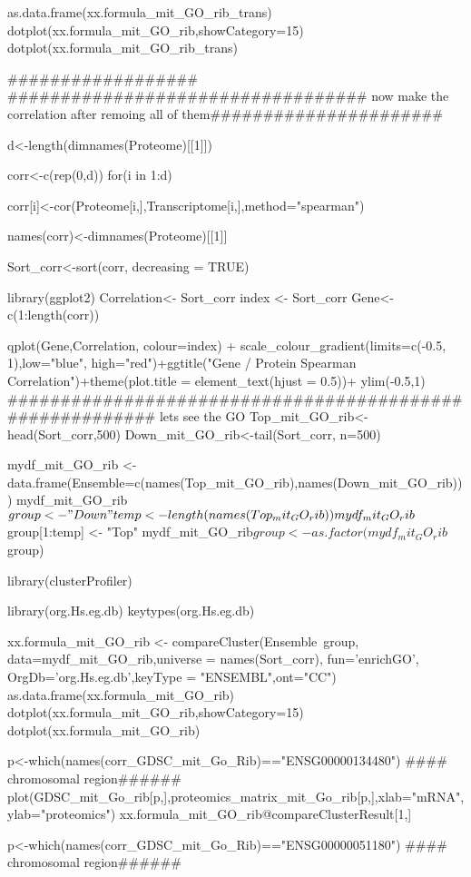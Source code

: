 {as.data.frame(xx.formula_mit_GO_rib_trans)
dotplot(xx.formula_mit_GO_rib,showCategory=15)
dotplot(xx.formula_mit_GO_rib_trans)










##################    ################################## now make the correlation after remoing all of them######################

d<-length(dimnames(Proteome)[[1]])

corr<-c(rep(0,d))
for(i in 1:d){

 corr[i]<-cor(Proteome[i,],Transcriptome[i,],method="spearman")

 } 
 names(corr)<-dimnames(Proteome)[[1]]

 Sort_corr<-sort(corr, decreasing = TRUE)

library(ggplot2)
Correlation<- Sort_corr
index <- Sort_corr
Gene<-c(1:length(corr))

qplot(Gene,Correlation, colour=index) + scale_colour_gradient(limits=c(-0.5, 1),low="blue", high="red")+ggtitle("Gene / Protein Spearman Correlation")+theme(plot.title = element_text(hjust = 0.5))+ ylim(-0.5,1)
######################################################### lets see the GO
Top_mit_GO_rib<-head(Sort_corr,500)
Down_mit_GO_rib<-tail(Sort_corr, n=500)


mydf_mit_GO_rib <- data.frame(Ensemble=c(names(Top_mit_GO_rib),names(Down_mit_GO_rib)))
mydf_mit_GO_rib$group <- "Down"
temp<-length(names(Top_mit_GO_rib))
mydf_mit_GO_rib$group[1:temp] <- "Top"
mydf_mit_GO_rib$group<-as.factor(mydf_mit_GO_rib$group)

library(clusterProfiler)

library(org.Hs.eg.db)
keytypes(org.Hs.eg.db)

xx.formula_mit_GO_rib <- compareCluster(Ensemble~group, data=mydf_mit_GO_rib,universe = names(Sort_corr),
fun='enrichGO', OrgDb='org.Hs.eg.db',keyType = "ENSEMBL",ont="CC")
as.data.frame(xx.formula_mit_GO_rib)
dotplot(xx.formula_mit_GO_rib,showCategory=15)
dotplot(xx.formula_mit_GO_rib)

p<-which(names(corr_GDSC_mit_Go_Rib)=="ENSG00000134480")  #### chromosomal region######
plot(GDSC_mit_Go_rib[p,],proteomics_matrix_mit_Go_rib[p,],xlab="mRNA",ylab="proteomics")
xx.formula_mit_GO_rib@compareClusterResult[1,]

p<-which(names(corr_GDSC_mit_Go_Rib)=="ENSG00000051180")  #### chromosomal region######

}
